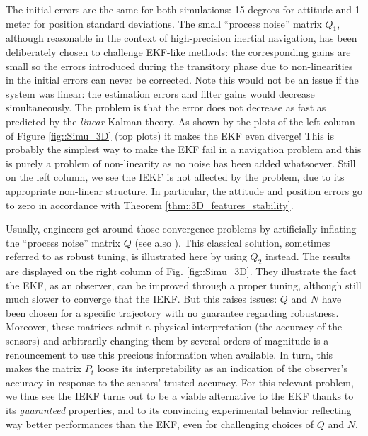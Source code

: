 \documentclass[a4paper,12pt,onecolumn]{article}
\begin{document}
The initial errors are the same for both simulations:  15 degrees for attitude and  1 meter for position standard deviations. The small ``process noise'' matrix $Q_1$, although reasonable in the context of high-precision inertial navigation, has been deliberately chosen to challenge EKF-like methods: the corresponding gains are small so  the errors introduced during the transitory phase due to non-linearities in the initial errors can never be corrected. Note this would not be an issue if the system was linear: the estimation errors and filter gains would decrease simultaneously. The problem is that the error does not decrease as fast as predicted by the \emph{linear} Kalman theory. As shown by the plots of the left column of Figure \ref{fig::Simu_3D} (top plots) it makes the EKF even diverge! This is probably the simplest way to  make the EKF fail in a navigation problem and this is purely a problem of  non-linearity as no noise has been added  whatsoever. Still on the left column, we see the IEKF is not affected by the problem, due to its appropriate non-linear structure. In particular, the attitude and position errors go to zero in accordance with Theorem \ref{thm::3D_features_stability}.

Usually, engineers get around those convergence problems by   artificially inflating the ``process noise'' matrix $Q$ (see also \cite{reif}). This classical solution, sometimes referred to as robust tuning, is illustrated here by using   $Q_2$ instead. The results are displayed on the right column of Fig. \ref{fig::Simu_3D}. They illustrate the fact the EKF, as an observer, can be improved  through a proper tuning, although still much slower to converge that the IEKF. But this raises issues: $Q$ and $N$ have been chosen for a specific trajectory with no guarantee regarding robustness. Moreover, these matrices admit a physical interpretation (the accuracy of the sensors) and arbitrarily changing them by several  orders of magnitude is a renouncement to use this precious information when available. In turn,  this makes  the matrix $P_t$ loose its interpretability as an indication of the observer's accuracy in response to the sensors' trusted accuracy.  For this relevant problem, we thus see the IEKF turns out to be a viable alternative to the EKF thanks to its \emph{guaranteed} properties, and to its convincing experimental behavior reflecting way better performances than the EKF, even for challenging choices of $Q$ and $N$.
\end{document}
